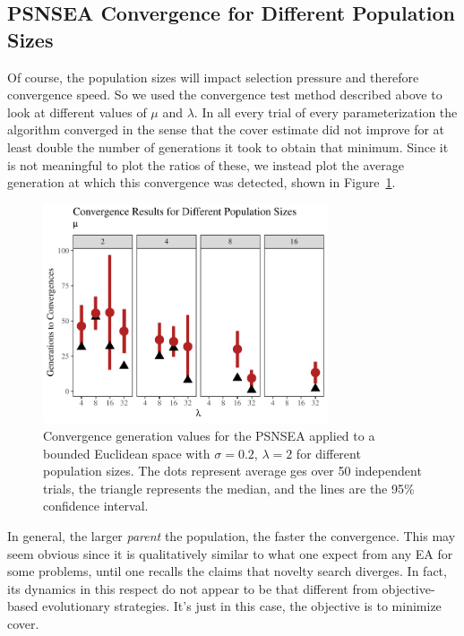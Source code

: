 \documentclass[twoside]{article}
\begin{document}
\subsection{PSNSEA Convergence for Different Population Sizes}
\label{subsec:psnsea:diffpop}

Of course, the population sizes will impact selection pressure and therefore convergence speed.  So we used the convergence test method described above to look at different values of $\mu$ and $\lambda$.  In all every trial of every parameterization the algorithm converged in the sense that the cover estimate did not improve for at least double the number of generations it took to obtain that minimum.  Since it is not meaningful to plot the ratios of these, we instead plot the average generation at which this convergence was detected, shown in Figure~\ref{fig:bounded:pop:conv}.  
%
\begin{figure}[th]
  \center\includegraphics[width=0.75\textwidth]{Figures/bounded-conv-s02-r02.pdf}
  \caption{\label{fig:bounded:pop:conv} Convergence generation values for the PSNSEA applied to a bounded Euclidean space with $\sigma=0.2$, $\lambda=2$ for different population sizes.  The dots represent average ges over 50 independent trials, the triangle represents the median, and the lines are the 95\% confidence interval.}
\end{figure}

In general, the larger \emph{parent} the population, the faster the convergence.  This may seem obvious since it is qualitatively similar to what one expect from any EA for some problems, until one recalls the claims that novelty search diverges.  In fact, its dynamics in this respect do not appear to be that different from objective-based evolutionary strategies.  It's just in this case, the objective is to minimize cover.
\end{document}
